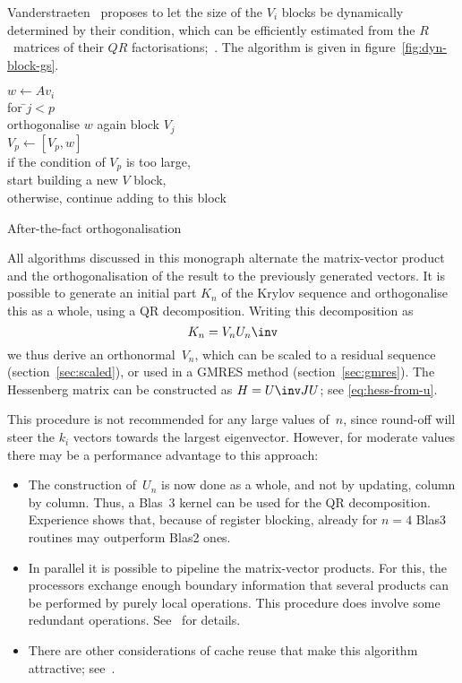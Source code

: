 \documentclass[11pt]{artikel3}
\begin{document}
\begin{Outline}
Vanderstraeten~\cite{Vanderstraeten:block-gs} proposes to
let the size of the $V_i$ blocks be dynamically determined
by their condition, which can be efficiently estimated
from the $R$~matrices of their $QR$ 
factorisations;~\cite{Bi:incremental-condition}.
The algorithm is given in figure~\ref{fig:dyn-block-gs}.
\begin{rfigure}
\begin{tabbing}
$w\leftarrow Av_i$\\
for \=$j<p$\\
\>orthogonalise $w$ again block $V_j$\\
$V_p\leftarrow[V_p,w]$\\
if \=the condition of $V_p$ is too large,\\
\>start building a new $V$ block,\\
\>otherwise, continue adding to this block
\end{tabbing}
\caption{Dynamic Block Gram-Schmidt orthogonalisation}
\label{fig:dyn-block-gs}
\end{rfigure}

 {After-the-fact orthogonalisation}
\label{sec:sstep-cg}

All algorithms discussed in this monograph alternate the matrix-vector
product and the orthogonalisation of the result to the previously
generated vectors.
It is possible to generate an initial part $K_n$ of the
Krylov sequence and orthogonalise this as a whole, using
a QR decomposition. Writing this decomposition as \[ K_n=V_nU_n\inv \]
we thus derive an orthonormal~$V_n$, which can be scaled
to a residual sequence (section~\ref{sec:scaled}),
or used in a GMRES method (section~\ref{sec:gmres}).
The Hessenberg matrix can be constructed as $H=U\inv JU$;
see \eqref{eq:hess-from-u}.

This procedure is not recommended for any large values of~$n$,
since round-off will steer the $k_i$ vectors towards the largest
eigenvector.
However, for moderate values there may be a performance advantage to
this approach:
\begin{itemize}
\item The construction of~$U_n$ is now done as a whole, and not
by updating, column by column. Thus, a Blas~3 kernel can be used
for the QR decomposition. 
Experience shows that, because of register blocking,
already for $n=4$ Blas3 routines may outperform Blas2 ones.
\item In parallel it is possible to pipeline the matrix-vector products.
For this, the processors exchange enough boundary information
that several products can be performed by purely local operations.
This procedure does involve some redundant operations.
See~\cite{OpJo:improved-sssor} for details.
\item There are other considerations of cache reuse that
make this algorithm attractive; see~\cite{ChGe:sstep}.
\end{itemize}


\end{Outline}
\end{document}
